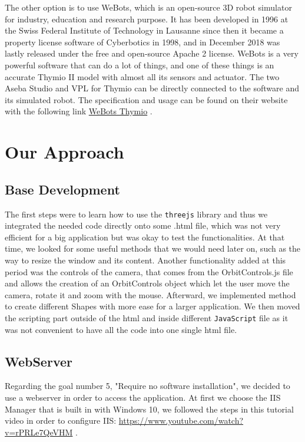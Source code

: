 \documentclass{scrbook}
\begin{document}
The other option is to use WeBots, which is an open-source 3D robot simulator for industry, education and research purpose. 
It has been developed in 1996 at the Swiss Federal Institute of Technology in Lausanne since then it became a property license software of Cyberbotics in 1998, 
and in December 2018 was lastly released under the free and open-source Apache 2 license.
WeBots is a very powerful software that can do a lot of things, and one of these things is an accurate Thymio II model with almost all its sensors and actuator. 
The two Aseba Studio and VPL for Thymio can be directly connected to the software and its simulated robot. 
The specification and usage can be found on their website with the following link \href{https://www.cyberbotics.com/doc/guide/thymio2#mosybas-thymio-ii}{WeBots Thymio} .

\chapter{Our Approach}

\section{Base Development}

The first steps were to learn how to use the \texttt{threejs} library and thus we integrated the needed code directly onto some .html file, which was not very efficient for a big application but was okay to test the functionalities. 
At that time, we looked for some useful methods that we would need later on, such as the way to resize the window and its content. Another functionality added at this period was the controls of the camera, that comes from the OrbitControls.js file and allows the creation of an OrbitControls object which let the user move the camera, rotate it and zoom with the mouse.
Afterward, we implemented method to create different Shapes with more ease for a larger application. We then moved the scripting part outside of the html and inside different \texttt{JavaScript} file as it was not convenient to have all the code into one single html file.

\section{WebServer \label{webserver}}
Regarding the goal number 5, "Require no software installation", we decided to use a webserver in order to access the application. At first we choose the IIS Manager that is built in with Windows 10, 
we followed the steps in this tutorial video in order to configure IIS: \url{https://www.youtube.com/watch?v=rPRLe7QeVHM} .
\end{document}
